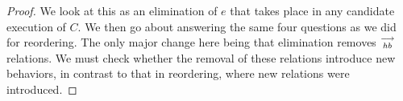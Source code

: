 \begin{proof}
    We look at this as an elimination of $e$ that takes place in any candidate execution of $C$. We then go about answering the same four questions as we did for reordering. The only major change here being that elimination removes $\stackrel{\longrightarrow}{_{hb}}$ relations. We must check whether the removal of these relations introduce new behaviors, in contrast to that in reordering, where new relations were introduced. 
    
    

    
    
    

    
    

\end{proof}